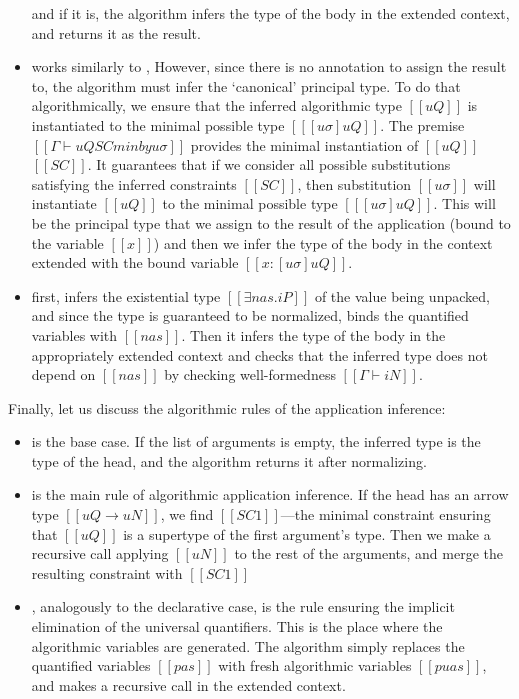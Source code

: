 \begin{itemize}
    and if it is, the algorithm infers the type of the body in the extended context,
    and returns it as the result. 
  \item {}
    works similarly to ,
    However, since there is no annotation to assign the result to,
    the algorithm must infer the `canonical' principal type.
    To do that algorithmically, we ensure that 
    the inferred algorithmic type $[[uQ]]$ is instantiated
    to the minimal possible type $[[ [uσ]uQ ]]$.
    The premise $[[Γ ⊢ uQ SC minby uσ]]$
    provides the minimal instantiation of $[[uQ]]$ \wrt $[[SC]]$. It 
    guarantees that if we consider all possible substitutions satisfying the inferred 
    constraints $[[SC]]$, then substitution $[[uσ]]$ will instantiate
    $[[uQ]]$ to the minimal possible type $[[ [uσ]uQ ]]$.
    This will be the principal type that we assign to the result of the application 
    (bound to the variable $[[x]]$)
    and then we infer the type of the body in the context extended with 
    the bound variable $[[x : [uσ]uQ]]$.
  \item {}
    first, infers the existential type $[[∃nas.iP]]$ of the value being unpacked,
    and since the type is guaranteed to be normalized, binds 
    the quantified variables with $[[nas]]$.
    Then it infers the type of the body in the appropriately extended context
    and checks that the inferred type does not depend on $[[nas]]$
    by checking well-formedness $[[Γ ⊢ iN]]$.
\end{itemize}

Finally, let us discuss the algorithmic rules of the application inference:
\begin{itemize}
  \item {}
    is the base case. If the list of arguments is empty, 
    the inferred type is the type of the head,
    and the algorithm returns it after normalizing.
  \item {}
    is the main rule of algorithmic application inference.
    If the head has an arrow type $[[uQ → uN]]$,
    we find $[[SC1]]$---the minimal constraint ensuring that 
    $[[uQ]]$ is a supertype of the first argument's type.
    Then we make a recursive call applying $[[uN]]$ to the rest of the arguments,
    and merge the resulting constraint with $[[SC1]]$
  \item {},
    analogously to the declarative case,
    is the rule ensuring the implicit elimination of the universal quantifiers. 
    This is the place where the algorithmic variables are generated.
    The algorithm simply replaces the quantified variables 
    $[[pas]]$ with fresh algorithmic variables $[[puas]]$,
    and makes a recursive call in the extended context. 
\end{itemize}

